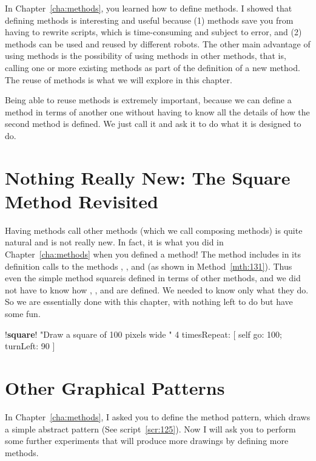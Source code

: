\documentclass[a4paper,10pt,twoside]{book}
\begin{document}
In Chapter~\ref{cha:methods}, you learned how to define methods. I showed that defining methods is interesting and useful because (1) methods save you from having to rewrite scripts, which is 
time-consuming and subject to error, and (2) methods can be used and reused by different 
robots. The other main advantage of using methods is the possibility of using methods in 
other methods, that is, calling one or more existing methods as part of the definition of a 
new method. The reuse of methods is what we will explore in this chapter. 

Being able to reuse methods is extremely important, because we can define a method 
in terms of another one without having to know all the details of how the second method is 
defined. We just call it and ask it to do what it is designed to do. 


\section{Nothing Really New: The Square Method Revisited} 

Having methods call other methods (which we call composing methods) is quite natural and 
is not really new. In fact, it is what you did in Chapter~\ref{cha:methods} when you defined a method! The 
method  includes in its definition calls to the methods , , and  
(as shown in Method~\ref{mth:131}). Thus even the simple method squareis defined in terms of other 
methods, and we did not have to know how , , and  are defined. We 
needed to know only what they do. So we are essentially done with this chapter, with nothing 
left to do but have some fun. 


\begin{method}[131]{}
!\textbf{square}!
"Draw a square of 100 pixels wide " 
4 timesRepeat: 
[ self go: 100; 
turnLeft: 90 ] 
\end{method}

\section{Other Graphical Patterns} 

In Chapter~\ref{cha:methods}, I asked you to define the method pattern, which draws a simple abstract pattern (See script~\ref{scr:125}). Now I will ask you to perform some further experiments that will 
produce more drawings by defining more methods. 
\end{document}
